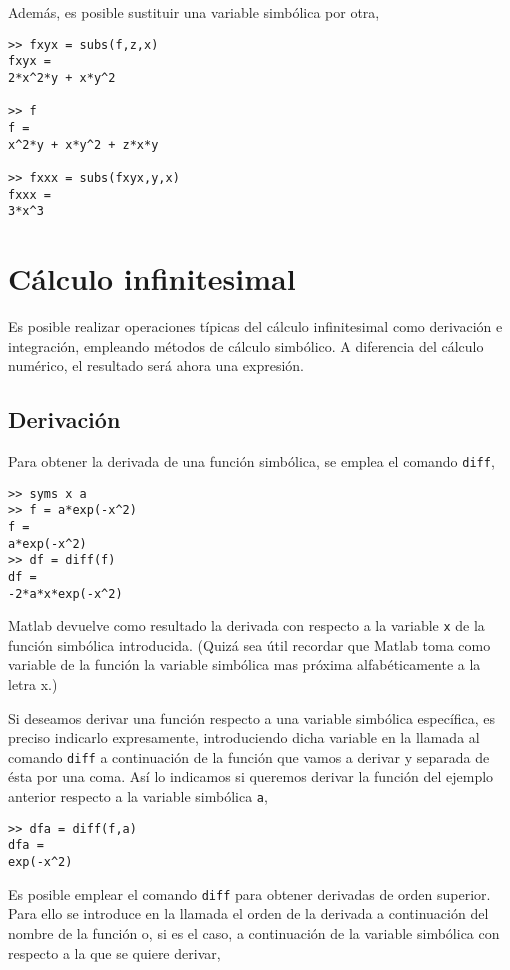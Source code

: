 Además, es posible sustituir una variable simbólica por otra,

\begin{verbatim}
>> fxyx = subs(f,z,x) 
fxyx = 
2*x^2*y + x*y^2
 
>> f 
f = 
x^2*y + x*y^2 + z*x*y
 
>> fxxx = subs(fxyx,y,x) 
fxxx = 
3*x^3
\end{verbatim}


\section{Cálculo infinitesimal}
Es posible realizar operaciones típicas del cálculo infinitesimal como derivación e integración, empleando métodos de cálculo simbólico. A diferencia del cálculo numérico, el resultado será ahora una expresión. 

\subsection{Derivación}
Para obtener la derivada de una función simbólica, se emplea el comando \texttt{diff},
\begin{verbatim}
>> syms x a
>> f = a*exp(-x^2) 
f = 
a*exp(-x^2) 
>> df = diff(f) 
df = 
-2*a*x*exp(-x^2) 
\end{verbatim}
Matlab devuelve como resultado la derivada con respecto a la variable \texttt{x} de la función simbólica introducida. (Quizá sea útil recordar que Matlab toma como variable de la función la variable simbólica mas próxima alfabéticamente a la letra x.)

Si deseamos derivar una función respecto a una variable simbólica específica, es preciso indicarlo expresamente, introduciendo dicha variable en la llamada al comando \texttt{diff} a continuación de la función que vamos a derivar y separada de ésta por una coma. Así lo indicamos si queremos derivar la función del ejemplo anterior respecto a la variable simbólica \texttt{a},

\begin{verbatim}
>> dfa = diff(f,a) 
dfa = 
exp(-x^2)
\end{verbatim}

Es posible emplear el comando \texttt{diff} para obtener derivadas de orden superior. Para ello se introduce en la llamada el orden de la derivada a continuación del nombre de la función o, si es el caso, a continuación de la variable simbólica con respecto a la que se quiere derivar,

